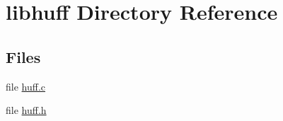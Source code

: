\hypertarget{dir_000005}{}\section{libhuff Directory Reference}
\label{dir_000005}
\subsection*{Files}
\begin{DoxyCompactItemize}
\item 
file \hyperlink{huff_8c}{huff.\+c}
\item 
file \hyperlink{huff_8h}{huff.\+h}
\end{DoxyCompactItemize}
